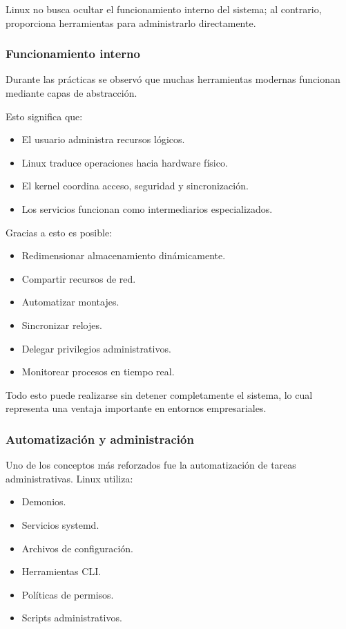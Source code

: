 \documentclass[11pt, letterpaper]{article}
\begin{document}
Linux no busca ocultar el funcionamiento interno del sistema; al contrario, proporciona herramientas para administrarlo directamente.
\subsubsection{Funcionamiento interno}
\label{sec:orgbf02312}

Durante las prácticas se observó que muchas herramientas modernas funcionan mediante capas de abstracción.

Esto significa que:

\begin{itemize}
\item El usuario administra recursos lógicos.
\item Linux traduce operaciones hacia hardware físico.
\item El kernel coordina acceso, seguridad y sincronización.
\item Los servicios funcionan como intermediarios especializados.
\end{itemize}

Gracias a esto es posible:

\begin{itemize}
\item Redimensionar almacenamiento dinámicamente.
\item Compartir recursos de red.
\item Automatizar montajes.
\item Sincronizar relojes.
\item Delegar privilegios administrativos.
\item Monitorear procesos en tiempo real.
\end{itemize}

Todo esto puede realizarse sin detener completamente el sistema, lo cual representa una ventaja importante en entornos empresariales.
\subsubsection{Automatización y administración}
\label{sec:org4767934}

Uno de los conceptos más reforzados fue la automatización de tareas administrativas.
Linux utiliza:

\begin{itemize}
\item Demonios.
\item Servicios systemd.
\item Archivos de configuración.
\item Herramientas CLI.
\item Políticas de permisos.
\item Scripts administrativos.
\end{itemize}
\end{document}
